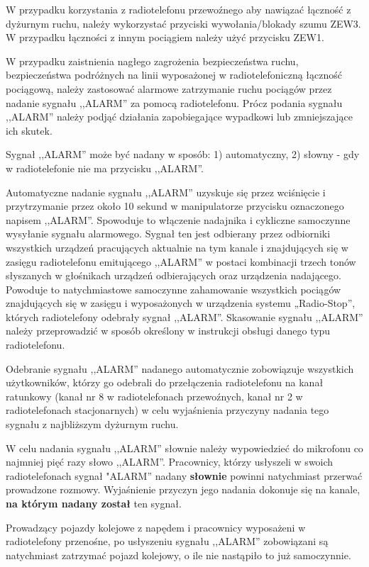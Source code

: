 W przypadku korzystania z radiotelefonu przewoźnego aby nawiązać łączność z dyżurnym ruchu, należy wykorzystać przyciski wywołania/blokady szumu ZEW3. W przypadku łączności z innym pociągiem należy użyć przycisku ZEW1. 

W przypadku zaistnienia nagłego zagrożenia bezpieczeństwa ruchu, bezpieczeństwa podróżnych na linii wyposażonej w radiotelefoniczną łączność
pociągową, należy zastosować alarmowe zatrzymanie ruchu pociągów przez nadanie sygnału ,,ALARM'' za pomocą radiotelefonu. Prócz podania sygnału
,,ALARM'' należy podjąć działania zapobiegające wypadkowi lub zmniejszające ich skutek.

Sygnał ,,ALARM'' może być nadany w sposób:
1) automatyczny,
2) słowny - gdy w radiotelefonie nie ma przycisku ,,ALARM''.

Automatyczne nadanie sygnału ,,ALARM'' uzyskuje się przez wciśnięcie i przytrzymanie przez około 10 sekund w manipulatorze przycisku oznaczonego
napisem ,,ALARM''. Spowoduje to włączenie nadajnika i cykliczne samoczynne wysyłanie sygnału alarmowego. Sygnał ten jest odbierany przez odbiorniki
wszystkich urządzeń pracujących aktualnie na tym kanale i znajdujących się w zasięgu radiotelefonu emitującego ,,ALARM'' w postaci kombinacji trzech tonów słyszanych w głośnikach urządzeń odbierających oraz urządzenia nadającego. Powoduje to natychmiastowe samoczynne zahamowanie wszystkich pociągów znajdujących się w zasięgu i wyposażonych w urządzenia systemu „Radio-Stop”, których radiotelefony odebrały sygnał ,,ALARM''. Skasowanie sygnału ,,ALARM'' należy przeprowadzić w sposób określony w instrukcji obsługi danego typu radiotelefonu. 

Odebranie sygnału ,,ALARM'' nadanego automatycznie zobowiązuje wszystkich użytkowników, którzy go odebrali do przełączenia radiotelefonu
na kanał ratunkowy (kanał nr 8 w radiotelefonach przewoźnych, kanał nr 2 w radiotelefonach stacjonarnych) w celu wyjaśnienia przyczyny nadania
tego sygnału z najbliższym dyżurnym ruchu.

W celu nadania sygnału ,,ALARM'' słownie należy wypowiedzieć do mikrofonu co najmniej pięć razy słowo ,,ALARM''.
Pracownicy, którzy usłyszeli w swoich radiotelefonach sygnał "ALARM” nadany \textbf{słownie} powinni natychmiast przerwać prowadzone rozmowy.
Wyjaśnienie przyczyn jego nadania dokonuje się na kanale, \textbf{na którym nadany został} ten sygnał.

Prowadzący pojazdy kolejowe z napędem i pracownicy wyposażeni w radiotelefony przenośne, po usłyszeniu sygnału ,,ALARM'' zobowiązani są
natychmiast zatrzymać pojazd kolejowy, o ile nie nastąpiło to już samoczynnie.

